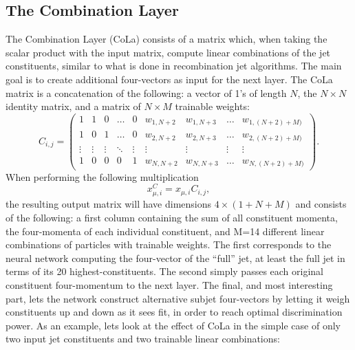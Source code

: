 \subsection{The Combination Layer}
\label{sec:cola}
The Combination Layer (CoLa) consists of a matrix which, when taking the scalar product with the input matrix, compute linear combinations of the jet constituents, similar to what is done in recombination jet algorithms. The main goal is to create additional four-vectors as input for the next layer. The CoLa matrix is a concatenation of the following: a vector of 1's of length $N$, the $N \times N$ identity matrix, and a matrix of $N \times M$ trainable weights:
\begin{equation}
  C_{i,j}=\begin{pmatrix}
1 & 1 & 0 & \dots & 0 & w_{1,N+2} & w_{1,N+3}                & \dots & w_{1,(N+2)+M)} \\
1 & 0 & 1 & \dots & 0 & w_{2,N+2} & w_{2,N+3}                & \dots & w_{2,(N+2)+M)} \\
\vdots & \vdots & \vdots & \ddots & \vdots & \vdots & \vdots & \vdots & \vdots \\
1 & 0 & 0 & 0 & 1 & w_{N,N+2} & w_{N,N+3}                    & \dots & w_{N,(N+2)+M)} 
\end{pmatrix}.
\end{equation}
When performing the following multiplication
\begin{equation}
  x_{\mu,i}^{C} = x_{\mu,i}  C_{i,j},
\end{equation}
the resulting output matrix will have dimensions $4 \times (1+N+M)$ and consists of the following: a first column containing the sum of all constituent momenta, the four-momenta of each individual constituent, and M=14 different linear combinations of particles with trainable weights. The first corresponds to the neural network computing the four-vector of the ``full'' jet, at least the full jet in terms of its 20 highest-\PT constituents. The second simply passes each original constituent four-momentum to the next layer. The final, and most interesting part, lets the network construct alternative subjet four-vectors by letting it weigh constituents up and down as it sees fit, in order to reach optimal discrimination power. As an example, lets look at the effect of CoLa in the simple case of only two input jet constituents and two trainable linear combinations:
